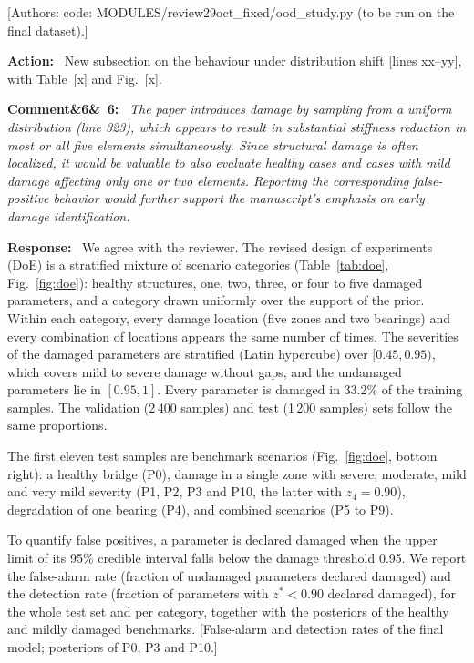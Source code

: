 \documentclass[11pt]{article}
\newenvironment{rcomment}[1]{\par\bigskip\noindent\textbf{Comment\ifx&#1&\else\ #1\fi:}\ \itshape}{\par}
\newenvironment{response}{\par\smallskip\noindent\color{resp}\textbf{Response:}\ }{\par}
\newenvironment{action}{\par\smallskip\noindent\color{resp}\textbf{Action:}\ }{\par}
\newcommand{\authornote}[1]{\textcolor{note}{\textsf{[Authors: #1]}}}
\newcommand{\tbd}[1]{\textcolor{note}{\textsf{[#1]}}}
\newcommand{\lines}[1]{\tbd{lines #1}}
\begin{document}
\authornote{code: MODULES/review29oct\_fixed/ood\_study.py (to be run on the final dataset).}

\begin{action}
New subsection on the behaviour under distribution shift \lines{xx--yy}, with Table~\tbd{x} and Fig.~\tbd{x}.
\end{action}

\begin{rcomment}{6}
The paper introduces damage by sampling from a uniform distribution (line 323), which appears to result in substantial
stiffness reduction in most or all five elements simultaneously. Since structural damage is often localized, it would be
valuable to also evaluate healthy cases and cases with mild damage affecting only one or two elements. Reporting the
corresponding false-positive behavior would further support the manuscript's emphasis on early damage identification.
\end{rcomment}

\begin{response}
We agree with the reviewer. The revised design of experiments (DoE) is a stratified mixture of scenario categories
(Table~\ref{tab:doe}, Fig.~\ref{fig:doe}): healthy structures, one, two, three, or four to five damaged parameters, and a
category drawn uniformly over the support of the prior. Within each category, every damage location (five zones and two
bearings) and every combination of locations appears the same number of times. The severities of the damaged
parameters are stratified (Latin hypercube) over $[0.45,0.95)$, which covers mild to severe damage without gaps, and
the undamaged parameters lie in $[0.95,1]$. Every parameter is damaged in 33.2\% of the training samples. The validation
(2\,400 samples) and test (1\,200 samples) sets follow the same proportions.

The first eleven test samples are benchmark scenarios (Fig.~\ref{fig:doe}, bottom right): a healthy bridge (P0),
damage in a single zone with severe, moderate, mild and very mild severity (P1, P2, P3 and P10, the latter with
$z_4=0.90$), degradation of one bearing (P4), and combined scenarios (P5 to P9).

To quantify false positives, a parameter is declared damaged when the upper limit of its 95\% credible interval falls
below the damage threshold 0.95. We report the false-alarm rate (fraction of undamaged parameters declared damaged)
and the detection rate (fraction of parameters with $z^*<0.90$ declared damaged), for the whole test set and per
category, together with the posteriors of the healthy and mildly damaged benchmarks.
\tbd{False-alarm and detection rates of the final model; posteriors of P0, P3 and P10.}
\end{response}
\end{document}
